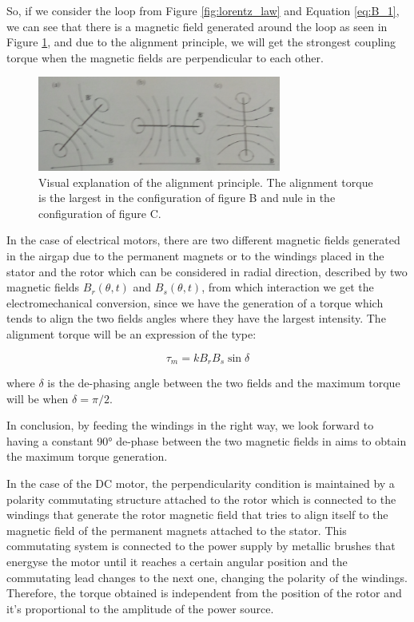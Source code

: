 \begin{description}
So, if we consider the loop from Figure \ref{fig:lorentz_law} and Equation \ref{eq:B_1}, we can see that there is a magnetic field generated around the loop as seen in Figure \ref{fig:alignment}, and due to the alignment principle, we will get the strongest coupling torque when the magnetic fields are perpendicular to each other.

\begin{figure}[htbp]
\centering
\includegraphics[width=8cm]{Images/alignment.png} 
\caption[Alignment Principle]{Visual explanation of the alignment principle. The alignment torque is the largest in the configuration of figure B and nule in the configuration of figure C.}
\label{fig:alignment}
\end{figure}

In the case of electrical motors, there are two different magnetic fields generated in the airgap due to the permanent magnets or to the windings placed in the stator and the rotor which can be considered in radial direction, described by two magnetic fields $B_{r}(\theta,t)$ and $B_{s}(\theta,t)$, from which interaction we get the electromechanical conversion, since we have the generation of a torque which tends to align the two fields angles where they have the largest intensity. The alignment torque will be an expression of the type:

\begin{equation}
	\label{eq:torque_2}
	\tau_{m} = k B_{r} B_{s} \sin \delta
\end{equation}

where $\delta$ is the de-phasing angle between the two fields and the maximum torque will be when $\delta = \pi / 2$.

\end{description}

In conclusion, by feeding the windings in the right way, we look forward to having a constant 90° de-phase between the two magnetic fields in aims to obtain the maximum torque generation.

In the case of the \acf{DC} motor, the perpendicularity condition is maintained by a polarity commutating structure attached to the rotor which is connected to the windings that generate the rotor magnetic field that tries to align itself to the magnetic field of the permanent magnets attached to the stator. This commutating system is connected to the power supply by metallic brushes that energyse the motor until it reaches a certain angular position and the commutating lead changes to the next one, changing the polarity of the windings. Therefore, the torque obtained is independent from the position of the rotor and it’s proportional to the amplitude of the power source.

